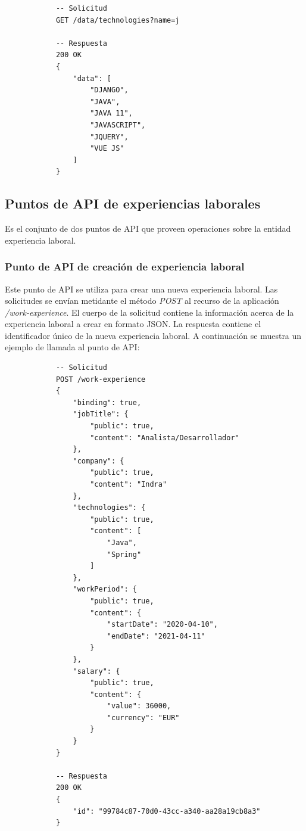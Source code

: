\documentclass[a4paper, 12pt]{book}
\begin{document}
        {\footnotesize
    \begin{verbatim}
			-- Solicitud
			GET /data/technologies?name=j

			-- Respuesta
			200 OK
			{
			    "data": [
			        "DJANGO",
			        "JAVA",
			        "JAVA 11",
			        "JAVASCRIPT",
			        "JQUERY",
			        "VUE JS"
			    ]
			}
    \end{verbatim}
    }

    \subsection{Puntos de API de experiencias laborales}
    \label{subsec:work_experience_endpoints}
    Es el conjunto de dos puntos de API que proveen operaciones sobre la entidad experiencia laboral.

    \subsubsection{Punto de API de creación de experiencia laboral}
    \label{subsec:post_work_experience}
    Este punto de API se utiliza para crear una nueva experiencia laboral.
    Las solicitudes se envían metidante el método \emph{POST} al recurso de la aplicación \emph{/work-experience}.
    El cuerpo de la solicitud contiene la información acerca de la experiencia laboral a crear en formato JSON.
    La respuesta contiene el identificador único de la nueva experiencia laboral.
    A continuación se muestra un ejemplo de llamada al punto de API:

        {\footnotesize
    \begin{verbatim}
			-- Solicitud
			POST /work-experience
			{
			    "binding": true,
			    "jobTitle": {
			        "public": true,
			        "content": "Analista/Desarrollador"
			    },
			    "company": {
			        "public": true,
			        "content": "Indra"
			    },
			    "technologies": {
			        "public": true,
			        "content": [
			            "Java",
			            "Spring"
			        ]
			    },
			    "workPeriod": {
			        "public": true,
			        "content": {
			            "startDate": "2020-04-10",
			            "endDate": "2021-04-11"
			        }
			    },
			    "salary": {
			        "public": true,
			        "content": {
			            "value": 36000,
			            "currency": "EUR"
			        }
			    }
			}

			-- Respuesta
			200 OK
			{
			    "id": "99784c87-70d0-43cc-a340-aa28a19cb8a3"
			}
    \end{verbatim}
    }
\end{document}
